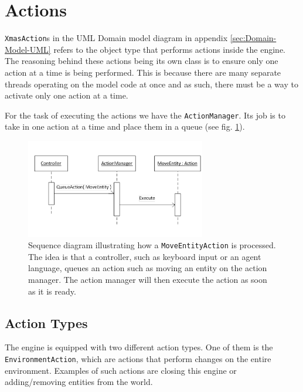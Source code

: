 
\section{Actions}

\texttt{XmasAction}s in the UML Domain model diagram in appendix \ref{sec:Domain-Model-UML}
refers to the object type that performs actions inside the engine.
The reasoning behind these actions being its own class is to ensure
only one action at a time is being performed. This is because there
are many separate threads operating on the model code at once and
as such, there must be a way to activate only one action at a time.

For the task of executing the actions we have the \texttt{ActionManager}.
Its job is to take in one action at a time and place them in a queue
(see fig. \ref{fig:ActionQueuing}).

\begin{figure}
\begin{centering}
\includegraphics[width=0.7\textwidth]{ActionQueuing}
\par\end{centering}

\caption{\label{fig:ActionQueuing}Sequence diagram illustrating how a \texttt{MoveEntityAction}
is processed. The idea is that a controller, such as keyboard input
or an agent language, queues an action such as moving an entity on
the action manager. The action manager will then execute the action
as soon as it is ready.}
\end{figure}



\subsection{Action Types}

The engine is equipped with two different action types. One of them
is the \texttt{EnvironmentAction}, which are actions that perform
changes on the entire environment. Examples of such actions are closing
this engine or adding/removing entities from the world.

